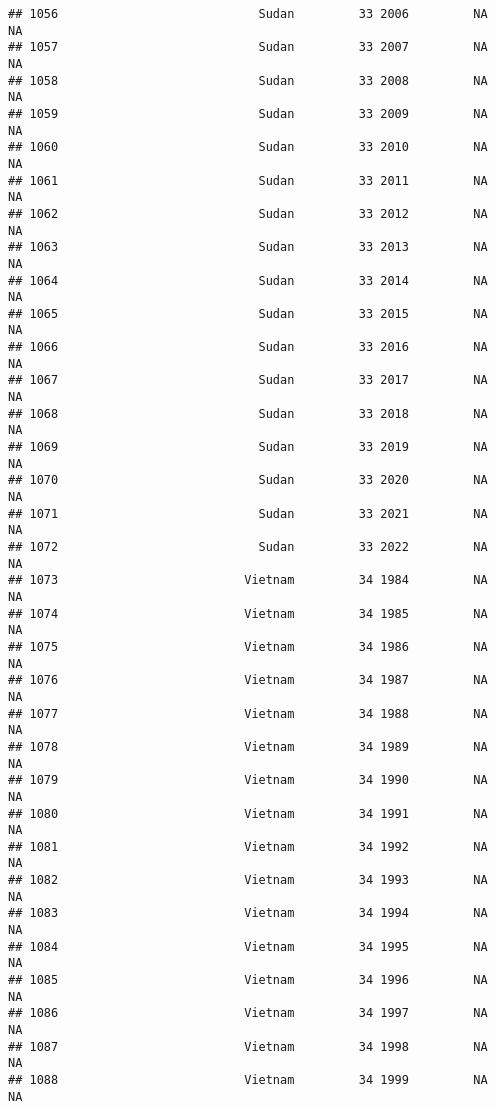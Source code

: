 \documentclass[
]{article}
\begin{document}
\begin{verbatim}
## 1056                            Sudan         33 2006         NA         NA
## 1057                            Sudan         33 2007         NA         NA
## 1058                            Sudan         33 2008         NA         NA
## 1059                            Sudan         33 2009         NA         NA
## 1060                            Sudan         33 2010         NA         NA
## 1061                            Sudan         33 2011         NA         NA
## 1062                            Sudan         33 2012         NA         NA
## 1063                            Sudan         33 2013         NA         NA
## 1064                            Sudan         33 2014         NA         NA
## 1065                            Sudan         33 2015         NA         NA
## 1066                            Sudan         33 2016         NA         NA
## 1067                            Sudan         33 2017         NA         NA
## 1068                            Sudan         33 2018         NA         NA
## 1069                            Sudan         33 2019         NA         NA
## 1070                            Sudan         33 2020         NA         NA
## 1071                            Sudan         33 2021         NA         NA
## 1072                            Sudan         33 2022         NA         NA
## 1073                          Vietnam         34 1984         NA         NA
## 1074                          Vietnam         34 1985         NA         NA
## 1075                          Vietnam         34 1986         NA         NA
## 1076                          Vietnam         34 1987         NA         NA
## 1077                          Vietnam         34 1988         NA         NA
## 1078                          Vietnam         34 1989         NA         NA
## 1079                          Vietnam         34 1990         NA         NA
## 1080                          Vietnam         34 1991         NA         NA
## 1081                          Vietnam         34 1992         NA         NA
## 1082                          Vietnam         34 1993         NA         NA
## 1083                          Vietnam         34 1994         NA         NA
## 1084                          Vietnam         34 1995         NA         NA
## 1085                          Vietnam         34 1996         NA         NA
## 1086                          Vietnam         34 1997         NA         NA
## 1087                          Vietnam         34 1998         NA         NA
## 1088                          Vietnam         34 1999         NA         NA

\end{verbatim}
\end{document}
